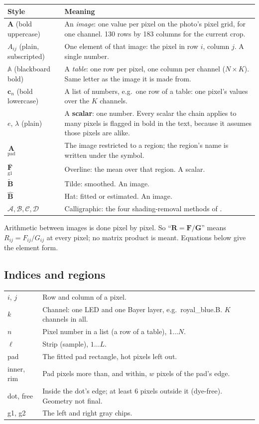 \documentclass[11pt,letter]{article}
\newcommand{\file}[1]{\texttt{\seqsplit{#1}}}
\newcommand{\SCALAR}{\textbf{scalar}}
\newcommand{\mF}{\mathbf{F}}   %
\newcommand{\mG}{\mathbf{G}}   %
\newcommand{\mR}{\mathbf{R}}   %
\newcommand{\mA}{\mathbf{A}}   %
\newcommand{\tB}{\widetilde{\mathbf{B}}}   %
\newcommand{\hB}{\widehat{\mathbf{B}}}     %
\newcommand{\tA}{\mathbb{A}}
\newcommand{\vc}{\mathbf{c}}           %
\newcommand{\reg}[2]{\underset{\text{#1}}{#2}}
\newcommand{\avg}[2]{\overline{\reg{#1}{#2}}}
\newcommand{\MA}{\mathcal{A}}
\newcommand{\MB}{\mathcal{B}}
\newcommand{\MC}{\mathcal{C}}
\newcommand{\MD}{\mathcal{D}}
\begin{document}
\begin{tabular}{@{}L{4.6cm}L{10.2cm}@{}}
\toprule
Style & Meaning \\
\midrule
$\mA$ (bold uppercase) & An \emph{image}: one value per pixel on the
  photo's pixel grid, for one channel.  130 rows by 183 columns for the
  current crop. \\
$A_{ij}$ (plain, subscripted) & One element of that image: the pixel in row
  $i$, column $j$.  A single number. \\
$\tA$ (blackboard bold) & A \emph{table}: one row per pixel, one column per
  channel ($N \times K$).  Same letter as the image it is made from. \\
$\vc_n$ (bold lowercase) & A list of numbers, e.g.\ one row of a table: one
  pixel's values over the $K$ channels. \\
$e$, $\lambda$ (plain) & A \SCALAR: one number.  Every scalar the chain
  applies to many pixels is flagged in bold in the text, because it assumes
  those pixels are alike. \\
$\reg{pad}{\mA}$ & The image restricted to a region; the region's name is
  written under the symbol. \\
$\avg{g1}{\mF}$ & Overline: the mean over that region.  A scalar. \\
$\tB$ & Tilde: smoothed.  An image. \\
$\hB$ & Hat: fitted or estimated.  An image. \\
$\MA, \MB, \MC, \MD$ & Calligraphic: the four shading-removal methods of
  \file{shading\_removal.tex}. \\
\bottomrule
\end{tabular}

\medskip
\noindent Arithmetic between images is done pixel by pixel.  So
``$\mR = \mF / \mG$'' means $R_{ij} = F_{ij} / G_{ij}$ at every pixel; no
matrix product is meant.  Equations below give the element form.

\subsection{Indices and regions}

\begin{tabular}{@{}L{2.4cm}L{12.4cm}@{}}
\toprule
$i$, $j$ & Row and column of a pixel. \\
$k$ & Channel: one LED and one Bayer layer, e.g.\ royal\_blue.B.  $K$
  channels in all. \\
$n$ & Pixel number in a list (a row of a table), $1 \dots N$. \\
$\ell$ & Strip (sample), $1 \dots L$. \\
\midrule
pad & The fitted pad rectangle, hot pixels left out. \\
inner, rim & Pad pixels more than, and within, $w$ pixels of the pad's edge. \\
dot, free & Inside the dot's edge; at least 6 pixels outside it (dye-free).
  Geometry not final. \\
g1, g2 & The left and right gray chips. \\
\bottomrule
\end{tabular}
\end{document}
